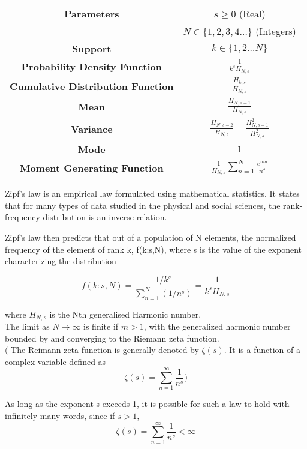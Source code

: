 \documentclass[14pt, a4paper]{article}
\theoremstyle{definition}
\begin{document}
\begin{center}
    \begin{tabular}{|c|c|}  %
\hline
 \textbf{Parameters }& $s \geq 0$ (Real) \\ & $N \in \{ 1,2,3,4 \dots \}$ (Integers) \\
 \hline
 \textbf{Support} & $k \in \{ 1,2 \dots N \} $ \\
 \hline
 \textbf{Probability Density Function} & 
 $ \frac{1}{k^s H_{N,s}}$
 \\
 \hline
 \textbf{Cumulative Distribution Function} &  $\frac{H_{k,s}}{H_{N,s}}$ \\
 \hline
 \textbf{Mean} & $\frac{H_{N,s-1}}{H_{N,s}}$ \\ 
 \hline
 \textbf{Variance} & $\frac{H_{N,s-2}}{H_{N,s}} - \frac{H^2_{N,s-1}}{H^2_{N,s}}$ \\
 \hline
 \textbf{Mode} & $1$ \\
 \hline
 \textbf{Moment Generating Function} & $\frac{1}{H_{N,s}} \sum^N_{n=1}\frac{e^{nm}}{n^s}$ \\
 \hline

  \end{tabular}
\end{center}

  
Zipf's law is an empirical law formulated using mathematical statistics. It states that for many types of data studied in the physical and social sciences, the rank-frequency distribution is an inverse relation.

Zipf's law then predicts that out of a population of N elements, the normalized frequency of the element of rank k, f(k;s,N), where s is  the value of the exponent characterizing the distribution

\[ f(k:s,N) = \frac{1/k^s}{\sum_{n=1}^N (1/n^s) } = \frac{1}{k^s H_{N,s}}\] 

where $H_{N,s}$ is the Nth generalised Harmonic number.
\\ The limit as $N \to \infty$ is finite if $m > 1$, with the generalized harmonic number bounded by and converging to the Riemann zeta function.
\\ $\big($ The Reimann zeta function is generally denoted by $\zeta (s)$. It is a function of a complex variable defined as 
\[ \zeta(s) = \sum^\infty_{n=1} \frac{1}{n^s} \big) \] 

As long as the exponent s exceeds 1, it is possible for such a law to hold with infinitely many words, since if $s>1$,
\[ \zeta(s) = \sum^\infty_{n=1} \frac{1}{n^s} < \infty \]
\end{document}

